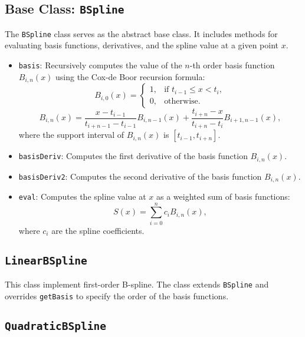 \documentclass{article}
\begin{document}
\subsection{Base Class: \texttt{BSpline}}
The \texttt{BSpline} class serves as the abstract base class. It includes methods for evaluating basis functions, derivatives, and the spline value at a given point $x$.
\begin{itemize}
    \item \texttt{basis}: Recursively computes the value of the $n$-th order basis function $B_{i,n}(x)$ using the Cox-de Boor recursion formula:
    \[
    B_{i,0}(x) = \begin{cases} 
        1, & \text{if } t_{i-1} \leq x < t_i, \\
        0, & \text{otherwise}.
    \end{cases}
    \]
    \[
    B_{i,n}(x) = \frac{x - t_{i-1}}{t_{i+n-1} - t_{i-1}} B_{i,n-1}(x) + \frac{t_{i+n} - x}{t_{i+n} - t_i} B_{i+1,n-1}(x),
    \]
    where the support interval of \( B_{i,n}(x) \) is \( [t_{i-1}, t_{i+n}] \).
    \item \texttt{basisDeriv}: Computes the first derivative of the basis function $B_{i,n}(x)$.
    \item \texttt{basisDeriv2}: Computes the second derivative of the basis function $B_{i,n}(x)$.
    \item \texttt{eval}: Computes the spline value at $x$ as a weighted sum of basis functions:
    \[
    S(x) = \sum_{i=0}^{n} c_i B_{i,n}(x),
    \]
    where $c_i$ are the spline coefficients.
\end{itemize}

\subsection{\texttt{LinearBSpline}}
This class implement first-order B-spline. The class extends \texttt{BSpline} and overrides \texttt{getBasis} to specify the order of the basis functions.


\subsection{\texttt{QuadraticBSpline}}
\end{document}

